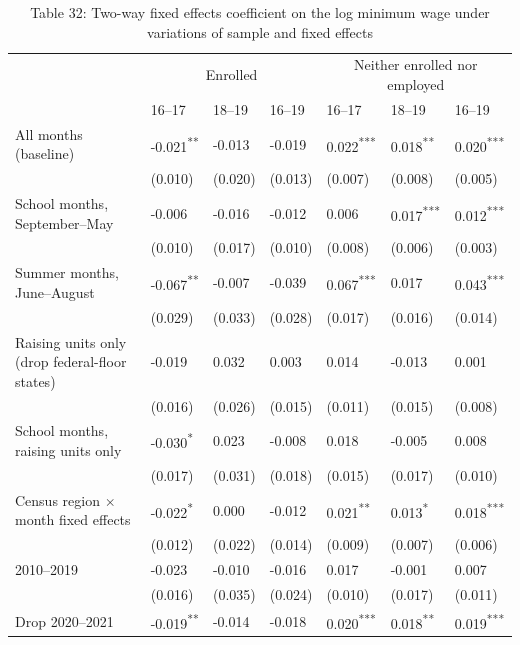 \documentclass[12pt]{article}
\begin{document}
\begin{table}
\centering
\caption{Table 32: Two-way fixed effects coefficient on the log minimum wage under variations of sample and fixed effects}

\small
\begin{tabular}{p{}p{}p{}p{}p{}p{}p{}}
\toprule
 & \multicolumn{3}{c}{Enrolled} & \multicolumn{3}{c}{Neither enrolled nor employed} \\

 & 16--17 & 18--19 & 16--19 & 16--17 & 18--19 & 16--19 \\
\midrule
All months (baseline) & -0.021\textsuperscript{**} & -0.013 & -0.019 & 0.022\textsuperscript{***} & 0.018\textsuperscript{**} & 0.020\textsuperscript{***} \\
 & (0.010) & (0.020) & (0.013) & (0.007) & (0.008) & (0.005) \\
School months, September--May & -0.006 & -0.016 & -0.012 & 0.006 & 0.017\textsuperscript{***} & 0.012\textsuperscript{***} \\
 & (0.010) & (0.017) & (0.010) & (0.008) & (0.006) & (0.003) \\
Summer months, June--August & -0.067\textsuperscript{**} & -0.007 & -0.039 & 0.067\textsuperscript{***} & 0.017 & 0.043\textsuperscript{***} \\
 & (0.029) & (0.033) & (0.028) & (0.017) & (0.016) & (0.014) \\
Raising units only (drop federal-floor states) & -0.019 & 0.032 & 0.003 & 0.014 & -0.013 & 0.001 \\
 & (0.016) & (0.026) & (0.015) & (0.011) & (0.015) & (0.008) \\
School months, raising units only & -0.030\textsuperscript{*} & 0.023 & -0.008 & 0.018 & -0.005 & 0.008 \\
 & (0.017) & (0.031) & (0.018) & (0.015) & (0.017) & (0.010) \\
Census region $\times$ month fixed effects & -0.022\textsuperscript{*} & 0.000 & -0.012 & 0.021\textsuperscript{**} & 0.013\textsuperscript{*} & 0.018\textsuperscript{***} \\
 & (0.012) & (0.022) & (0.014) & (0.009) & (0.007) & (0.006) \\
2010--2019 & -0.023 & -0.010 & -0.016 & 0.017 & -0.001 & 0.007 \\
 & (0.016) & (0.035) & (0.024) & (0.010) & (0.017) & (0.011) \\
Drop 2020--2021 & -0.019\textsuperscript{**} & -0.014 & -0.018 & 0.020\textsuperscript{***} & 0.018\textsuperscript{**} & 0.019\textsuperscript{***} \\

\end{tabular}
\end{table}
\end{document}
